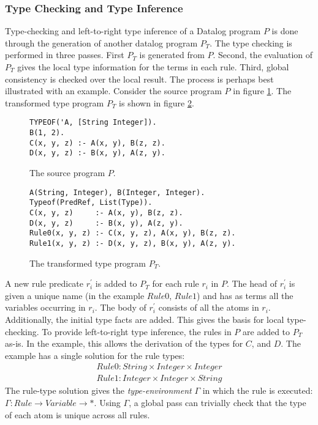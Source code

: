 \subsubsection{Type Checking and Type Inference}
Type-checking and left-to-right type inference of a Datalog program $P$ is done through the generation of another datalog program $P_T$. The type checking is performed in three passes. First $P_T$ is generated from $P$. Second, the evaluation of $P_T$ gives the local type information for the terms in each rule. Third, global consistency is checked over the local result. The process is perhaps best illustrated with an example. Consider the source program $P$ in figure \ref{figure:sourceP}. The transformed type program $P_T$ is shown in figure \ref{figure:sourcePT}.
\begin{figure}[!ht]
\begin{verbatim}
TYPEOF('A, [String Integer]).
B(1, 2).
C(x, y, z) :- A(x, y), B(z, z).
D(x, y, z) :- B(x, y), A(z, y).
\end{verbatim}
\caption{The source program $P$.}
\label{figure:sourceP}
\end{figure}

\begin{figure}[!ht]
\begin{verbatim}
A(String, Integer), B(Integer, Integer).
Typeof(PredRef, List(Type)).
C(x, y, z)     :- A(x, y), B(z, z).
D(x, y, z)     :- B(x, y), A(z, y).
Rule0(x, y, z) :- C(x, y, z), A(x, y), B(z, z).
Rule1(x, y, z) :- D(x, y, z), B(x, y), A(z, y).
\end{verbatim}
\caption{The transformed type program $P_T$.}
\label{figure:sourcePT}
\end{figure}
\noindent
A new rule predicate $r^{'}_i$ is added to $P_T$ for each rule $r_i$ in $P$. The head of $r^{'}_i$ is given a unique name (in the example $Rule0$, $Rule1$) and has as terms all the variables occurring in $r_i$. The body of $r^{'}_i$ consists of all the atoms in $r_i$. Additionally, the initial type facts are added. This gives the basis for local type-checking. To provide left-to-right type inference, the rules in $P$ are added to $P_T$ as-is. In the example, this allows the derivation of the types for $C$, and $D$. 
The example has a single solution for the rule types:
\begin{align*}
Rule0 : String  \times Integer \times Integer\\
Rule1 : Integer \times Integer \times String
\end{align*}
The rule-type solution gives the \textit{type-environment} $\Gamma$ in which the rule is executed: $\Gamma : Rule \rightarrow Variable \rightarrow *$. Using $\Gamma$, a global pass can trivially check that the type of each atom is unique across all rules.

